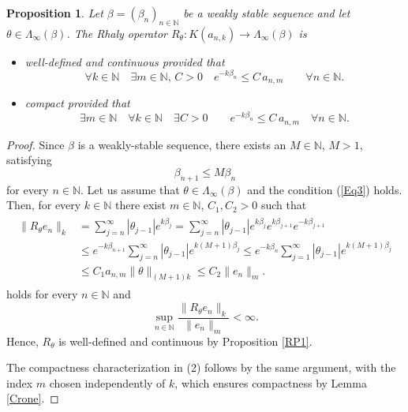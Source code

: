 \documentclass{birkjour}
\newtheorem{prop}[thm]{Proposition}
\theoremstyle{definition}
\theoremstyle{remark}
\numberwithin{equation}{section}
\begin{document}
\begin{prop}\label{R5}
Let $\beta=(\beta_{n})_{n\in \mathbb{N}}$ be a weakly stable sequence and let 
$\theta\in \Lambda_{\infty}(\beta)$. The Rhaly operator $R_{\theta}:K(a_{n,k})\to \Lambda_{\infty}(\beta)$ 
is 
\begin{itemize}
\item[1.] well-defined and continuous provided that
\begin{equation}\label{Eq3}
\forall k\in \mathbb{N} \quad \exists m\in \mathbb{N},\, C>0  \quad 
e^{-k\beta_{n}}\leq C\, a_{n,m} \qquad \forall n\in \mathbb{N}.
\end{equation}
\item[2.] compact provided that
\begin{equation}\label{REQ4}
\exists m\in \mathbb{N} \quad \forall k\in \mathbb{N} \quad \exists C>0  \qquad 
e^{-k\beta_{n}}\leq C\, a_{n,m} \quad \forall n\in \mathbb{N}.
\end{equation}
\end{itemize}
\end{prop}
\begin{proof} Since $\beta$ is a weakly-stable sequence, there exists an $M\in \mathbb{N}$, $M> 1$, satisfying
$$\beta_{n+1}\leq M\beta_{n}$$
for every $n\in \mathbb{N}$. Let us assume that $\theta\in \Lambda_{\infty}(\beta)$ and the condition (\ref{Eq3}) holds. Then, for every $k\in \mathbb{N}$ there exist $m\in \mathbb{N}$, $C_{1},C_{2}>0$ such that
\begin{align*}
\begin{split}
\|R_{\theta}e_{n}\|_{k}&=\sum^{\infty}_{j=n} |\theta_{j-1}|e^{k\beta_{j}} =\sum^{\infty}_{j=n} |\theta_{j-1}|e^{k\beta_{j}} e^{k\beta_{j+1}} e^{-k\beta_{j+1}}
\\ &\leq e^{-k\beta_{n+1}} \sum^{\infty}_{j=n} |\theta_{j-1}|e^{k(M+1)\beta_{j}} \leq e^{-k\beta_{n}} \sum^{\infty}_{j=1} |\theta_{j-1}|e^{k(M+1)\beta_{j}} \\
&\leq C_{1} a_{n,m}\|\theta\|_{(M+1)k}  
\leq C_{2}\|e_{n}\|_{m}.
\end{split}
\end{align*}
holds for every $n\in \mathbb{N}$ and
$$\label{T1}
\sup_{n\in \mathbb{N}}\frac{\|R_{\theta}e_{n}\|_{k}}{\|e_{n}\|_{m}}< \infty.
$$
Hence, $R_{\theta}$ is well-defined and continuous by  Proposition \ref{RP1}.

The compactness characterization in (2) follows by the same argument, 
with the index $m$ chosen independently of $k$, which ensures compactness 
by Lemma \ref{Crone}.
\end{proof} 
\end{document}
